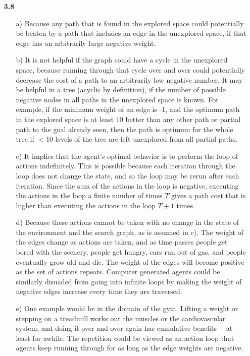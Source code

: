\documentclass{article}
\begin{document}
\begin{enumerate}
\item[\textbf{3.8}]
\begin{enumerate}
\item[a)]
Because any path that is found in the explored space could potentially be beaten by a path that includes
an edge in the unexplored space, if that edge has an arbitrarily large negative weight.\\
\item[b)]
It is not helpful if the graph could have a cycle in the unexplored space, because running through that cycle
over and over could potentially decrease the cost of a path to an arbitrarily low negative number. It may be
helpful in a tree (acyclic by definition), if the number of possible negative nodes in all paths in the unexplored space is
known. For example, if the minimum weight of an edge is -1, and the optimum path in the explored space is at
least 10 better than any other path or partial path to the goal already seen, then the path is optimum for
the whole tree if $<$10 levels of the tree are left unexplored from all partial paths.
\item[c)]
It implies that the agent's optimal behavior is to perform the loop of actions indefinitely. This is possible because
each iteration through the loop does not change the state, and so the loop may be rerun after each iteration.
Since the sum of the actions in the loop is negative, executing the actions in the loop a finite number of times $T$ gives a path 
cost that is higher than executing the actions in the loop $T+1$ times.
\item[d)]
Because these actions cannot be taken with no change in the state of the environment and the search graph,
as is assumed in c). The weight of the edges change as actions are taken, and as time passes people get bored with the
scenery, people get hungry, cars run out of gas, and people eventually grow old and die. The weight of the edges will become
positive as the set of actions repeats.
Computer generated agents could be similarly disuaded from going into infinite loops by making the weight of negative edges
increase every time they are traversed.
\item[e)]
One example would be in the domain of the gym. Lifting a weight or stepping on a treadmill works out
the muscles or the cardiovascular system, and doing it over and over again has cumulative benefits ---at least for awhile.
The repetition could be viewed as an action loop that agents keep running through for as long as the edge weights are
negative.
\end{enumerate}


\end{enumerate}
\end{document}
